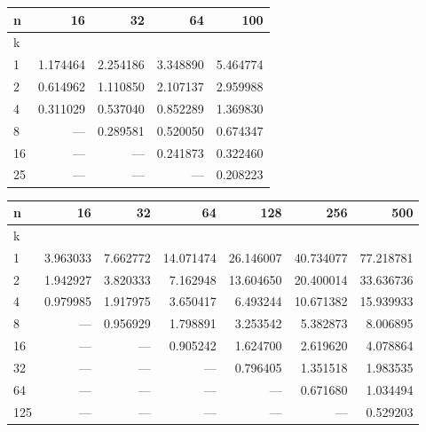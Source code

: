 \begin{tabular}{lrrrr}
\toprule
{n} &       16  &       32  &       64  &       100 \\
\midrule
k  &           &           &           &           \\
1  &  1.174464 &  2.254186 &  3.348890 &  5.464774 \\
2  &  0.614962 &  1.110850 &  2.107137 &  2.959988 \\
4  &  0.311029 &  0.537040 &  0.852289 &  1.369830 \\
8  &       --- &  0.289581 &  0.520050 &  0.674347 \\
16 &       --- &       --- &  0.241873 &  0.322460 \\
25 &       --- &       --- &       --- &  0.208223 \\
\bottomrule
\end{tabular}

\begin{tabular}{lrrrrrr}
\toprule
{n} &       16  &       32  &        64  &        128 &        256 &        500 \\
\midrule
k   &           &           &            &            &            &            \\
1   &  3.963033 &  7.662772 &  14.071474 &  26.146007 &  40.734077 &  77.218781 \\
2   &  1.942927 &  3.820333 &   7.162948 &  13.604650 &  20.400014 &  33.636736 \\
4   &  0.979985 &  1.917975 &   3.650417 &   6.493244 &  10.671382 &  15.939933 \\
8   &       --- &  0.956929 &   1.798891 &   3.253542 &   5.382873 &   8.006895 \\
16  &       --- &       --- &   0.905242 &   1.624700 &   2.619620 &   4.078864 \\
32  &       --- &       --- &        --- &   0.796405 &   1.351518 &   1.983535 \\
64  &       --- &       --- &        --- &        --- &   0.671680 &   1.034494 \\
125 &       --- &       --- &        --- &        --- &        --- &   0.529203 \\
\bottomrule
\end{tabular}

